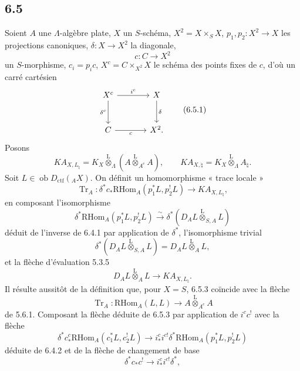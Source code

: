 \documentclass[11pt]{article}
\providecommand{\RHom}{\mathrm{RHom}}
\providecommand{\Tr}{\operatorname{Tr}}
\providecommand{\Tr}{\operatorname{Tr}}
\providecommand{\lten}{\overset{\mathrm L}{\otimes}}
\providecommand{\Ob}{\operatorname{ob}}
\providecommand{\Tr}{\operatorname{Tr}}
\providecommand{\RHom}{\mathrm{RHom}}
\providecommand{\lten}{\overset{\mathrm L}{\otimes}}
\providecommand{\RHom}{\mathrm R\mathcal{H}om}
\providecommand{\lten}{\overset{\mathrm L}{\otimes}}
\providecommand{\Ob}{\operatorname{ob}}
\providecommand{\Tr}{\operatorname{Tr}}
\providecommand{\lten}{\overset{\mathrm L}{\otimes}}
\providecommand{\lten}{\overset{\mathrm L}{\otimes}}
\providecommand{\Ob}{\operatorname{Ob}}
\providecommand{\lten}{\overset{\mathrm L}{\otimes}}
\providecommand{\RHom}{\mathrm{RHom}}
\providecommand{\Tr}{\operatorname{Tr}}
\providecommand{\Ob}{\operatorname{ob}}
\providecommand{\Ob}{\operatorname{Ob}}
\providecommand{\lten}{\overset{\mathrm L}{\otimes}}
\begin{document}
\subsection*{6.5}
Soient $A$ une $\Lambda$-algèbre plate, $X$ un $S$-schéma, $X^2=X\times_SX$, $p_1,p_2:X^2\to X$ les projections canoniques, $\delta:X\to X^2$ la diagonale,
\[
c:C\longrightarrow X^2
\]
un $S$-morphisme, $c_i=p_ic$, $X^c=C\times_{X^2}X$ le schéma des points fixes de $c$, d'où un carré cartésien
\begin{equation}
\begin{tikzcd}[column sep=large,row sep=large]
X^c \arrow[r,"i^c"] \arrow[d,"\delta^c"'] & X \arrow[d,"\delta"]\\
C \arrow[r,"c"'] & X^2 .
\end{tikzcd}
\tag{6.5.1}
\end{equation}
Posons
\begin{equation}
KA_{X,L_{\natural}}=K_X\lten_{\Lambda}(A\lten_{A^e}A),
\qquad
KA_{X,\natural}=K_X\lten_{\Lambda}A_{\natural}.
\tag{6.5.2}
\end{equation}
Soit $L\in\Ob D_{\mathrm{ctf}}({}_AX)$. On définit un homomorphisme « trace locale »
\begin{equation}
\Tr_A:\delta^*c_*\RHom_A(p_1^*L,p_2^!L)
\longrightarrow
KA_{X,L_{\natural}},
\tag{6.5.3}
\end{equation}
en composant l'isomorphisme
\begin{equation}
\delta^*\RHom_A(p_1^*L,p_2^!L)
\xrightarrow{\sim}
\delta^*(D_AL\lten_{S,A}L)
\tag{6.5.4}
\end{equation}
déduit de l'inverse de 6.4.1 par application de $\delta^*$, l'isomorphisme trivial
\begin{equation}
\delta^*(D_AL\lten_{S,A}L)=D_AL\lten_AL,
\tag{6.5.5}
\end{equation}
et la flèche d'évaluation 5.3.5
\begin{equation}
D_AL\lten_AL\longrightarrow KA_{X,L_{\natural}}.
\tag{6.5.6}
\end{equation}
Il résulte aussitôt de la définition que, pour $X=S$, 6.5.3 coïncide avec la flèche
\[
\Tr_A:\RHom_A(L,L)\longrightarrow A\lten_{A^e}A
\]
de 5.6.1. Composant la flèche déduite de 6.5.3 par application de $i^cc^!$ avec la flèche
\begin{equation}
\delta^*c_*^c\RHom_A(c_1^*L,c_2^!L)
\longrightarrow
i_*^ci^{c!}\delta^*\RHom_A(p_1^*L,p_2^!L)
\tag{6.5.7}
\end{equation}
déduite de 6.4.2 et de la flèche de changement de base
\[
\delta^*c_*c^!\longrightarrow i_*^ci^{c!}\delta^*,
\]
\end{document}
